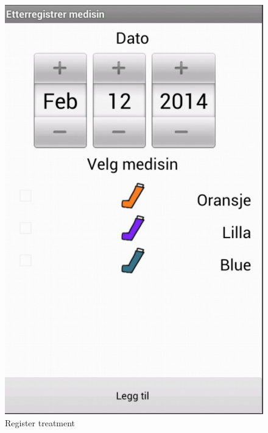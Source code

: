 \begin{figure}
\begin{minipage}[b]{0.4\linewidth}
			\includegraphics[width=0.20\paperwidth]{Pictures/app-screenshots/register_treatment.png}
		\caption{Register treatment}
		\label{fig:register_treatment}
	\end{minipage}  
\end{figure}


